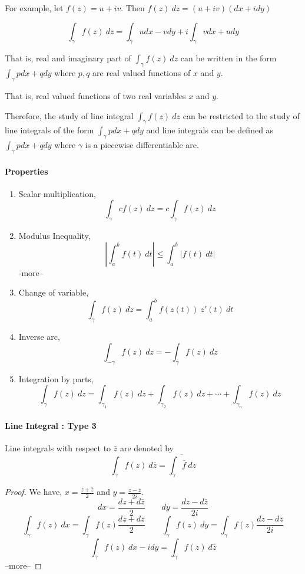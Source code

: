 	For example, let $f(z) = u+iv$.
	Then $f(z)\ dz = (u+iv)(dx+idy)$

\[ \int_\gamma f(z)\ dz = \int_\gamma udx - vdy + i \int_\gamma vdx + udy \]

	That is, real and imaginary part of $\int_\gamma f(z)\ dz$ can be written in the form $\int_\gamma pdx + qdy$ where $p,q$ are real valued functions of $x$ and $y$.
\begin{commentary}
	That is, real valued functions of two real variables $x$ and $y$.
\end{commentary}
	Therefore, the study of line integral $\int_\gamma f(z)\ dz$ can be restricted to the study of line integrals of the form $\int_\gamma pdx+qdy$ and line integrals can be defined as $\int_\gamma pdx+qdy$ where $\gamma$ is a piecewise differentiable arc.

\paragraph{Properties}
\begin{enumerate}
	\item Scalar multiplication,
		\[ \int_\gamma cf(z)\ dz = c\int_\gamma f(z)\ dz \]
	\item Modulus Inequality,
		\[ \left| \int_a^b f(t)\ dt \right| \le \int_a^b |f(t)\ dt| \] -more--
	\item Change of variable,
		\[ \int_\gamma f(z)\ dz = \int_a^b f(z(t))\ z'(t)\ dt \]
	\item Inverse arc,
		\[ \int_{-\gamma} f(z)\ dz = -\int_\gamma f(z)\ dz \]
	\item Integration by parts,
		\[ \int_\gamma f(z)\ dz = \int_{\gamma_1} f(z)\ dz + \int_{\gamma_2} f(z)\ dz+ \cdots + \int_{\gamma_n} f(z)\ dz \]
\end{enumerate}

\paragraph{Line Integral : Type 3}
	Line integrals with respect to $\bar{z}$ are denoted by
\[ \int_\gamma f(z)\ d\bar{z} = \overline{ \int_\gamma \bar{f}\ dz} \]

\begin{proof}
We have,
$x = \frac{z+\bar{z}}{2}$ and $y = \frac{z-\bar{z}}{2i}$. 
\[ dx = \frac{dz+d\bar{z}}{2} \qquad dy = \frac{dz-d\bar{z}}{2i} \]
\[ \int_\gamma f(z)\ dx = \int_\gamma f(z) \frac{dz + d\bar{z}}{2} \qquad \int_\gamma f(z)\ dy = \int_\gamma f(z) \frac{dz-d\bar{z}}{2i} \]
\[ \int_\gamma f(z)\ dx-idy = \int_\gamma f(z)\ d\bar{z} \] --more--
\end{proof}

